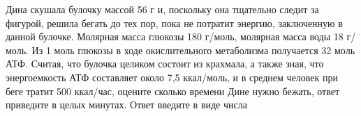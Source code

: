
Дина
скушала булочку массой 56 г и, поскольку она тщательно следит за фигурой,
решила бегать до тех пор, пока не потратит энергию, заключенную в данной
булочке. Молярная масса глюкозы 180 г/моль, молярная масса воды 18 г/моль. Из 1
моль глюкозы в ходе окислительного метаболизма получается 32 моль АТФ. Считая,
что булочка целиком состоит из крахмала, а также зная, что энергоемкость
АТФ  составляет около 7,5 ккал/моль, и в
среднем человек при беге тратит 500 ккал/час, оцените сколько времени Дине
нужно бежать, ответ приведите в целых минутах. Ответ введите в виде числа

\explanationSection

